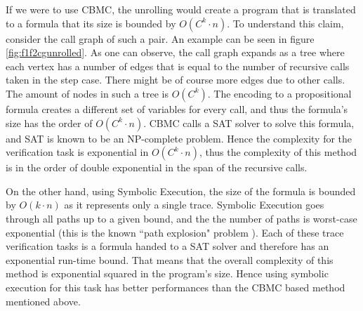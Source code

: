 If we were to use CBMC, the unrolling would create a program that is translated to a formula that its size is bounded by $O(C^k{\cdot}n)$. To understand this claim, consider the call graph of such a pair. An example can be seen in figure \ref{fig:f1f2cgunrolled}. As one can observe, the call graph expands as a tree where each vertex has a number of edges that is equal to the number of recursive calls taken in the step case. There might be of course more edges due to other calls. The amount of nodes in such a tree is $O(C^k)$. The encoding to a propositional formula creates a different set of variables for every call, and thus the formula's size has the order of $O(C^k{\cdot}n)$. CBMC calls a SAT solver to solve this formula, and SAT is known to be an NP-complete problem. Hence the complexity for the verification task is exponential in $O(C^k{\cdot}n)$, thus the complexity of this method is in the order of double exponential in the span of the recursive calls.

On the other hand, using Symbolic Execution, the size of the formula is bounded by $O(k{\cdot}n)$ as it represents only a single trace. Symbolic Execution goes through all paths up to a given bound, and the the number of paths is worst-case exponential (this is the known ``path explosion" problem  \cite{10.1007/978-3-540-78800-3_28}). Each of these trace verification tasks is a formula handed to a SAT solver and therefore has an exponential run-time bound. That means that the overall complexity of this method is exponential squared in the program's size. 
Hence using symbolic execution for this task has better performances than the CBMC based method mentioned above.


